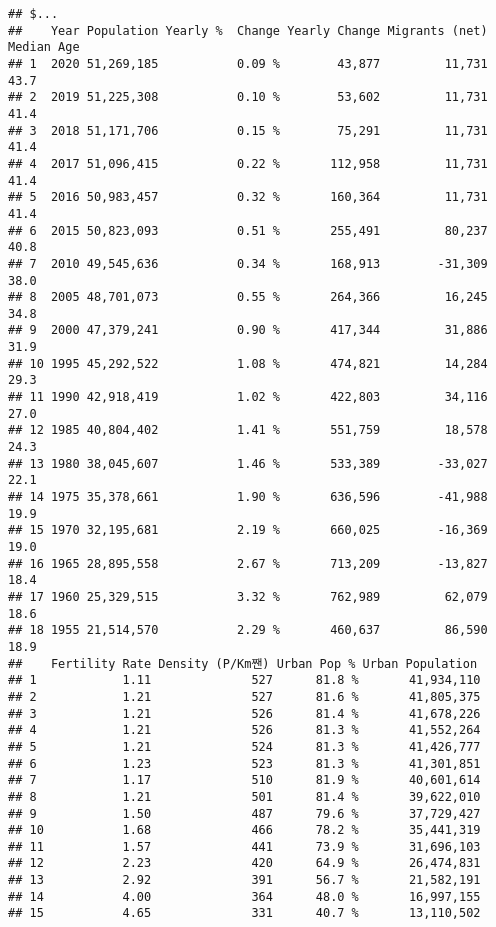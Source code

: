 \documentclass[
]{article}
\begin{document}
\begin{verbatim}
## $...
##    Year Population Yearly %  Change Yearly Change Migrants (net) Median Age
## 1  2020 51,269,185           0.09 %        43,877         11,731       43.7
## 2  2019 51,225,308           0.10 %        53,602         11,731       41.4
## 3  2018 51,171,706           0.15 %        75,291         11,731       41.4
## 4  2017 51,096,415           0.22 %       112,958         11,731       41.4
## 5  2016 50,983,457           0.32 %       160,364         11,731       41.4
## 6  2015 50,823,093           0.51 %       255,491         80,237       40.8
## 7  2010 49,545,636           0.34 %       168,913        -31,309       38.0
## 8  2005 48,701,073           0.55 %       264,366         16,245       34.8
## 9  2000 47,379,241           0.90 %       417,344         31,886       31.9
## 10 1995 45,292,522           1.08 %       474,821         14,284       29.3
## 11 1990 42,918,419           1.02 %       422,803         34,116       27.0
## 12 1985 40,804,402           1.41 %       551,759         18,578       24.3
## 13 1980 38,045,607           1.46 %       533,389        -33,027       22.1
## 14 1975 35,378,661           1.90 %       636,596        -41,988       19.9
## 15 1970 32,195,681           2.19 %       660,025        -16,369       19.0
## 16 1965 28,895,558           2.67 %       713,209        -13,827       18.4
## 17 1960 25,329,515           3.32 %       762,989         62,079       18.6
## 18 1955 21,514,570           2.29 %       460,637         86,590       18.9
##    Fertility Rate Density (P/Km짼) Urban Pop % Urban Population
## 1            1.11              527      81.8 %       41,934,110
## 2            1.21              527      81.6 %       41,805,375
## 3            1.21              526      81.4 %       41,678,226
## 4            1.21              526      81.3 %       41,552,264
## 5            1.21              524      81.3 %       41,426,777
## 6            1.23              523      81.3 %       41,301,851
## 7            1.17              510      81.9 %       40,601,614
## 8            1.21              501      81.4 %       39,622,010
## 9            1.50              487      79.6 %       37,729,427
## 10           1.68              466      78.2 %       35,441,319
## 11           1.57              441      73.9 %       31,696,103
## 12           2.23              420      64.9 %       26,474,831
## 13           2.92              391      56.7 %       21,582,191
## 14           4.00              364      48.0 %       16,997,155
## 15           4.65              331      40.7 %       13,110,502

\end{verbatim}
\end{document}
